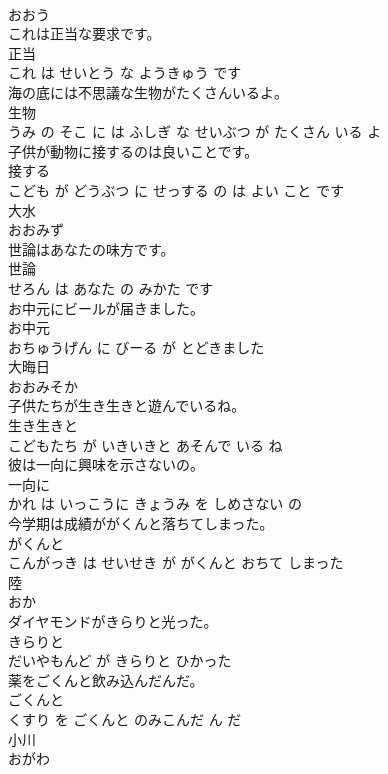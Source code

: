 \documentclass[8pt]{extreport}
\begin{document}
\begin{CJK}{UTF8}{min}
\\	おおう		
\\	これは正当な要求です。	
\\	正当 
\\	これ は せいとう な ようきゅう です			
\\	海の底には不思議な生物がたくさんいるよ。	
\\	生物 
\\	うみ の そこ に は ふしぎ な せいぶつ が たくさん いる よ			
\\	子供が動物に接するのは良いことです。	
\\	接する 
\\	こども が どうぶつ に せっする の は よい こと です			
\\	大水	
\\	おおみず		
\\	世論はあなたの味方です。	
\\	世論 
\\	せろん は あなた の みかた です			
\\	お中元にビールが届きました。	
\\	お中元 
\\	おちゅうげん に びーる が とどきました			
\\	大晦日	
\\	おおみそか		
\\	子供たちが生き生きと遊んでいるね。	
\\	生き生きと 
\\	こどもたち が いきいきと あそんで いる ね			
\\	彼は一向に興味を示さないの。	
\\	一向に 
\\	かれ は いっこうに きょうみ を しめさない の			
\\	今学期は成績ががくんと落ちてしまった。	
\\	がくんと 
\\	こんがっき は せいせき が がくんと おちて しまった			
\\	陸	
\\	おか		
\\	ダイヤモンドがきらりと光った。	
\\	きらりと 
\\	だいやもんど が きらりと ひかった			
\\	薬をごくんと飲み込んだんだ。	
\\	ごくんと 
\\	くすり を ごくんと のみこんだ ん だ			
\\	小川	
\\	おがわ		

\end{CJK}
\end{document}
